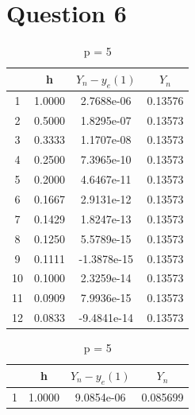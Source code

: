 \documentclass[11pt]{article}
\begin{document}
\section*{Question 6}
\begin{table}[H]
\caption{Numerical solution at $x_{n}=1$}
    \begin{subtable}{.65\linewidth}
        \caption{p = 4}                       
\begin{tabular}{|c|c|c|c|}        
\hline                            
 & h & $Y_{n}-y_{e}(1)$ & $Y_{n}$ \\                   
\hline                                                                     
1 & 1.0000 & 2.7688e-06 & 0.13576 \\ 
\hline                           
2 & 0.5000 & 1.8295e-07 & 0.13573\\ 
\hline                           
3 & 0.3333 & 1.1707e-08 & 0.13573 \\ 
\hline                           
4 & 0.2500 & 7.3965e-10 & 0.13573 \\ 
\hline                           
5 & 0.2000 & 4.6467e-11 & 0.13573\\ 
\hline                           
6 & 0.1667 & 2.9131e-12 & 0.13573 \\ 
\hline                           
7 & 0.1429 & 1.8247e-13 & 0.13573 \\ 
\hline                           
8 & 0.1250 & 5.5789e-15 & 0.13573 \\ 
\hline                           
9 & 0.1111 & -1.3878e-15 & 0.13573 \\ 
\hline                           
10 & 0.1000& 2.3259e-14 & 0.13573 \\
\hline                           
11 & 0.0909 & 7.9936e-15& 0.13573 \\
\hline                           
12 & 0.0833 &-9.4841e-14 & 0.13573 \\
\hline               
\end{tabular}                     
 \end{subtable}%
    \begin{subtable}{.5\linewidth}
      \caption{p = 5}                   
\begin{tabular}{|c|c|c|c|}       
\hline                           
 & h & $Y_{n}-y_{e}(1)$ & $Y_{n}$\\                  
\hline                                                     
1 & 1.0000  & 9.0854e-06 & 0.085699\\ 

\end{tabular}
\end{subtable}
\end{table}
\end{document}
